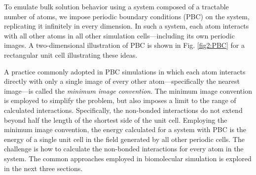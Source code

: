 To emulate bulk solution behavior using a system composed of a tractable number
of atoms, we impose periodic boundary conditions (PBC) on the system,
replicating it infinitely in every dimension. In such a system, each atom
interacts with all other atoms in all other simulation cells---including its own
periodic images. \cite{Allen_Tildesley} A two-dimensional illustration of PBC is
shown in Fig. \ref{fig2:PBC} for a rectangular unit cell illustrating these
ideas.

A practice commonly adopted in PBC simulations in which each atom interacts
directly with only a single image of every other atom---specifically the nearest
image---is called the \emph{minimum image convention}. The minimum image
convention is employed to simplify the problem, but also imposes a limit to the
range of calculated interactions. Specifically, the non-bonded interactions do
not extend beyond half the length of the shortest side of the unit cell.
Employing the minimum image convention, the energy calculated for a system with
PBC is the energy of a single unit cell in the field generated by all other
periodic cells. The challenge is how to calculate the non-bonded interactions
for every atom in the system. The common approaches employed in biomolecular
simulation is explored in the next three sections.

